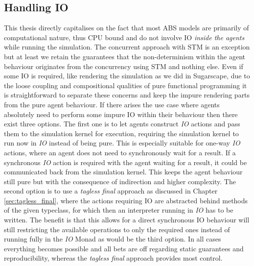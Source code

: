 \subsection{Handling IO}
This thesis directly capitalises on the fact that most ABS models are primarily of computational nature, thus CPU bound and do not involve IO \textit{inside the agents} while running the simulation. The concurrent approach with STM is an exception but at least we retain the guarantees that the non-determinism within the agent behaviour originates from the concurrency using STM and nothing else. Even if some IO is required, like rendering the simulation as we did in Sugarscape, due to the loose coupling and compositional qualities of pure functional programming it is straightforward to separate these concerns and keep the impure rendering parts from the pure agent behaviour. If there arises the use case where agents absolutely need to perform some impure IO within their behaviour then there exist three options. The first one is to let agents construct \textit{IO} actions and pass them to the simulation kernel for execution, requiring the simulation kernel to run now in \textit{IO} instead of being pure. This is especially suitable for one-way \textit{IO} actions, where an agent does not need to synchronously wait for a result. If a synchronous \textit{IO} action is required with the agent waiting for a result, it could be communicated back from the simulation kernel. This keeps the agent behaviour still pure but with the consequence of indirection and higher complexity. The second option is to use a \textit{tagless final} approach as discussed in Chapter \ref{sec:tagless_final}, where the actions requiring IO are abstracted behind methods of the given typeclass, for which then an interpreter running in \textit{IO} has to be written. The benefit is that this allows for a direct synchronous IO behaviour will still restricting the available operations to only the required ones instead of running fully in the \textit{IO} Monad as would be the third option. In all cases everything becomes possible and all bets are off regarding static guarantees and reproducibility, whereas the \textit{tagless final} approach provides most control.



